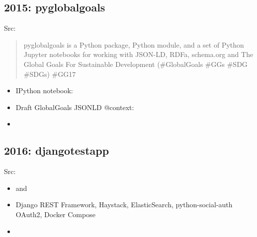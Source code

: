 \documentclass[letter,,openany,oneside,english]{sphinxhowto}
\begin{document}
\subsection{2015: pyglobalgoals}
\label{\detokenize{resume:pyglobalgoals}}
\begin{DUlineblock}{0em}
\item[] Src: 
\end{DUlineblock}
\begin{quote}

pyglobalgoals is a Python package, Python module, and a set of
Python Jupyter notebooks for working with JSON-LD, RDFa, schema.org
and The Global Goals For Sustainable Development (\#GlobalGoals \#GGs
\#SDG \#SDGs) \#GG17
\end{quote}
\begin{itemize}
\item {} 
IPython notebook:

\item {} 
Draft GlobalGoals JSONLD @context:

\item {} 

\end{itemize}


\subsection{2016: djangotestapp}
\label{\detokenize{resume:djangotestapp}}
\begin{DUlineblock}{0em}
\item[] Src: 
\end{DUlineblock}
\begin{itemize}
\item {} 
 and 

\item {} 
Django REST Framework, Haystack, ElasticSearch, python-social-auth
OAuth2, Docker Compose

\item {} 

\end{itemize}
\end{document}
